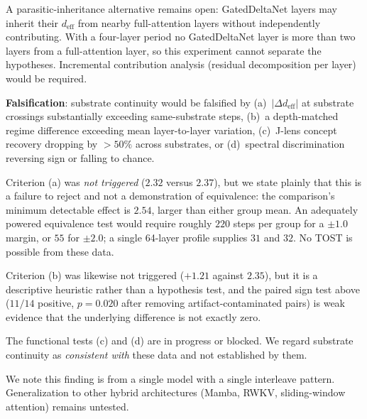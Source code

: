 A parasitic-inheritance alternative remains open: GatedDeltaNet layers
may inherit their $d_\text{eff}$ from nearby full-attention layers
without independently contributing. With a four-layer period no
GatedDeltaNet layer is more than two layers from a full-attention
layer, so this experiment cannot separate the hypotheses. Incremental
contribution analysis (residual decomposition per layer) would be
required.

\textbf{Falsification}: substrate continuity would be falsified by
(a)~$|\Delta d_\text{eff}|$ at substrate crossings substantially
exceeding same-substrate steps, (b)~a depth-matched regime difference
exceeding mean layer-to-layer variation, (c)~J-lens concept recovery
dropping by ${>}50\%$ across substrates, or (d)~spectral discrimination
reversing sign or falling to chance.

Criterion (a) was \emph{not triggered} ($2.32$ versus $2.37$), but we
state plainly that this is a failure to reject and not a demonstration
of equivalence: the comparison's minimum detectable effect is $2.54$,
larger than either group mean. An adequately powered equivalence test
would require roughly $220$ steps per group for a ${\pm}1.0$ margin,
or $55$ for ${\pm}2.0$; a single 64-layer profile supplies $31$ and
$32$. No TOST is possible from these data.

Criterion (b) was likewise not triggered ($+1.21$ against $2.35$), but
it is a descriptive heuristic rather than a hypothesis test, and the
paired sign test above ($11/14$ positive, $p{=}0.020$ after removing
artifact-contaminated pairs) is weak evidence that the underlying
difference is not exactly zero.

The functional tests (c) and (d) are in progress or blocked. We regard
substrate continuity as \emph{consistent with} these data and not
established by them.

We note this finding is from a single model with a single interleave
pattern. Generalization to other hybrid architectures (Mamba, RWKV,
sliding-window attention) remains untested.

